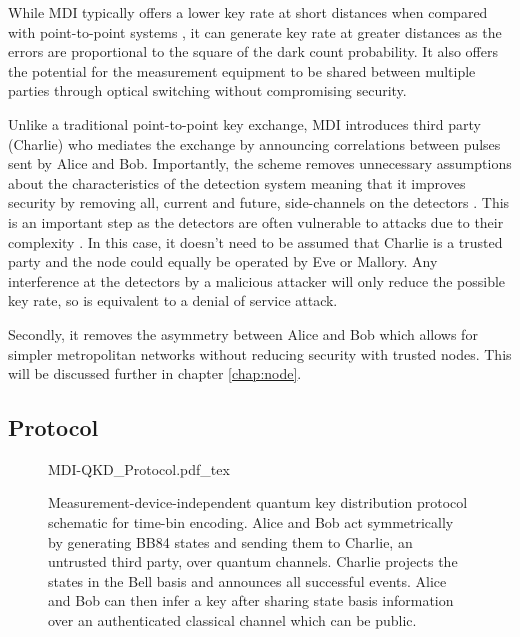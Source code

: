 While \ac{MDI} typically offers a lower key rate at short distances when compared with point-to-point systems \cite{Sibson2017InP}, it can generate key rate at greater distances \cite{yin2016} as the errors are proportional to the square of the dark count probability. It also offers the potential for the measurement equipment to be shared between multiple parties through optical switching without compromising security.

Unlike a traditional point-to-point key exchange, \ac{MDI} introduces third party (Charlie) who mediates the exchange by announcing correlations between pulses sent by Alice and Bob. Importantly, the scheme removes unnecessary assumptions about the characteristics of the detection system meaning that it improves security by removing all, current and future, side-channels on the detectors \cite{mdi-qkd}. This is an important step as the detectors are often vulnerable to attacks due to their complexity \cite{Lydersen2010a, Makarov2006}. In this case, it doesn't need to be assumed that Charlie is a trusted party and the node could equally be operated by Eve or Mallory. Any interference at the detectors by a malicious attacker will only reduce the possible key rate, so is equivalent to a denial of service attack.

Secondly, it removes the asymmetry between Alice and Bob which allows for simpler metropolitan networks without reducing security with trusted nodes. This will be discussed further in chapter \ref{chap:node}.

\subsection{Protocol}

\begin{figure}[tp]
	\centering
	\small
	\def\svgwidth{\textwidth} 
	{MDI-QKD_Protocol.pdf_tex}
	\caption[Measure-device-independent quantum key distribution time-bin encoded protocol]{Measurement-device-independent quantum key distribution protocol schematic for time-bin encoding. Alice and Bob act symmetrically by generating BB84 states and sending them to Charlie, an untrusted third party, over quantum channels. Charlie projects the states in the Bell basis and announces all successful events. Alice and Bob can then infer a key after sharing state basis information over an authenticated classical channel which can be public.}
	\label{fig:mdi_protocol}
\end{figure}

